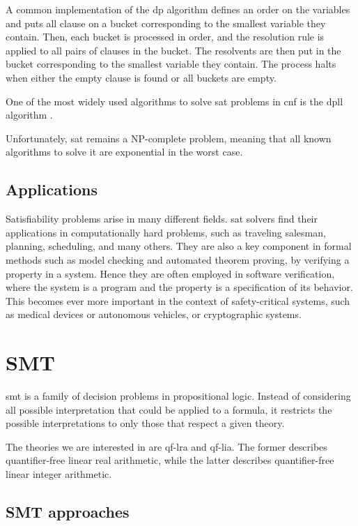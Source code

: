 A common implementation of the \gls{dp} algorithm defines an order on the variables and puts all clause on a bucket corresponding to the smallest variable they contain.
Then, each bucket is processed in order, and the resolution rule is applied to all pairs of clauses in the bucket.
The resolvents are then put in the bucket corresponding to the smallest variable they contain.
The process halts when either the empty clause is found or all buckets are empty.

One of the most widely used algorithms to solve \gls{sat} problems in \gls{cnf} is the \gls{dpll} algorithm \cite{paper:dpll}.

Unfortunately, \gls{sat} remains a NP-complete problem, meaning that all known algorithms to solve it are exponential in the worst case.

\subsection*{Applications}

Satisfiability problems arise in many different fields.
\gls{sat} solvers find their applications in computationally hard problems, such as traveling salesman, planning, scheduling, and many others.
They are also a key component in formal methods such as model checking and automated theorem proving, by verifying a property in a system.
Hence they are often employed in software verification, where the system is a program and the property is a specification of its behavior.
This becomes ever more important in the context of safety-critical systems, such as medical devices or autonomous vehicles, or cryptographic systems.

\section{SMT}

\gls{smt} is a family of decision problems in propositional logic.
Instead of considering all possible interpretation that could be applied to a formula, it restricts the possible interpretations to only those that respect a given theory.

The theories we are interested in are \gls{qf-lra} and \gls{qf-lia}.
The former describes quantifier-free linear real arithmetic, while the latter describes quantifier-free linear integer arithmetic.

\subsection*{SMT approaches}

